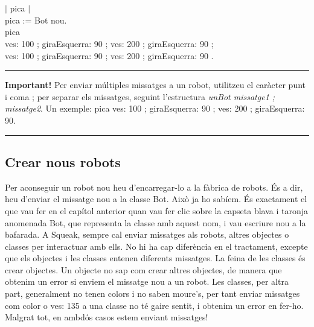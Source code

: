 \newpage

\begin{script} 
\noindent
\textsf{\upshape
\\
\\$|$ pica $|$\\
pica := Bot nou.\\
pica \\
\hspace*{5mm}    ves: 100 ; giraEsquerra: 90 ; ves: 200 ; giraEsquerra: 90 ;\\
\hspace*{5mm}    ves: 100 ; giraEsquerra: 90 ; ves: 200 ; giraEsquerra: 90 .\\
}
\label{scr2-3}
\end{script}

\vspace{3mm}
\noindent
\rule{\textwidth}{2pt}
\noindent
\textbf{Important!} Per enviar múltiples missatges a un robot, utilitzeu el caràcter punt i coma ; per separar els missatges, seguint l'estructura \emph{unBot missatge1 ; missatge2}. Un exemple: \textsf{pica ves: 100 ; giraEsquerra: 90 ; ves: 200 ; giraEsquerra: 90}.\\
\noindent
\rule{\textwidth}{2pt}

\subsection{Crear nous robots}
Per aconseguir un robot nou heu d'encarregar-lo a la fàbrica de robots. És a dir, heu d'enviar el missatge \textsf{nou} a la classe \textsf{Bot}. Això ja ho sabíem. És exactament el que vau fer en el capítol anterior quan vau fer clic sobre la capseta blava i taronja anomenada \textsf{Bot}, que representa la classe amb aquest nom, i vau escriure \textsf{nou} a la bafarada. A Squeak, sempre cal enviar missatges als robots, altres objectes o classes per interactuar amb ells. No hi ha cap diferència en el tractament, excepte que els objectes i les classes entenen diferents missatges. La feina de les classes és crear objectes. Un objecte no sap com crear altres objectes, de manera que obtenim un error si enviem el missatge \textsf{nou} a un robot. Les classes, per altra part, generalment no tenen colors i no saben moure's, per tant enviar missatges com \textsf{color} o \textsf{ves: 135} a una classe no té gaire sentit, i obtenim un error en fer-ho. Malgrat tot, en ambdós casos estem enviant missatges!

